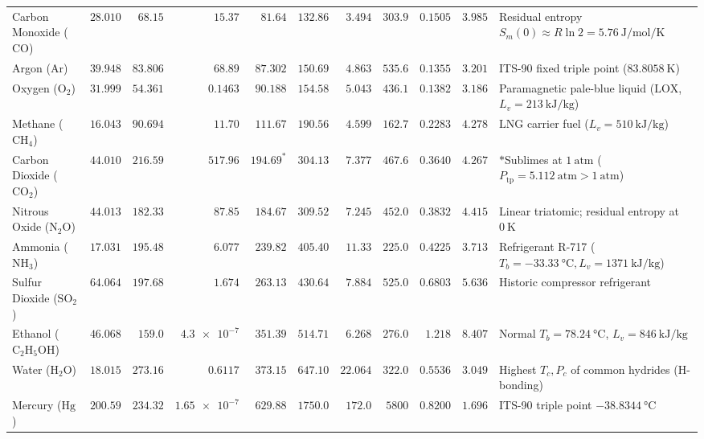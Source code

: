 \begin{center}
\begin{tabularx}{\linewidth}{@{}l r r r r r r r r r X@{}}
Carbon Monoxide ($\mathrm{CO}$) & $28.010$ & $68.15$ & $15.37$ & $81.64$ & $132.86$ & $3.494$ & $303.9$ & $0.1505$ & $3.985$ & Residual entropy $S_m(0) \approx R\ln 2 = \SI{5.76}{\joule\per\mole\per\kelvin}$ \\
Argon ($\mathrm{Ar}$) & $39.948$ & $83.806$ & $68.89$ & $87.302$ & $150.69$ & $4.863$ & $535.6$ & $0.1355$ & $3.201$ & ITS-90 fixed triple point ($\SI{83.8058}{\kelvin}$) \\
Oxygen ($\mathrm{O_2}$) & $31.999$ & $54.361$ & $0.1463$ & $90.188$ & $154.58$ & $5.043$ & $436.1$ & $0.1382$ & $3.186$ & Paramagnetic pale-blue liquid ($\mathrm{LOX}$, $L_v = \SI{213}{\kilo\joule\per\kilogram}$) \\
Methane ($\mathrm{CH_4}$) & $16.043$ & $90.694$ & $11.70$ & $111.67$ & $190.56$ & $4.599$ & $162.7$ & $0.2283$ & $4.278$ & $\mathrm{LNG}$ carrier fuel ($L_v = \SI{510}{\kilo\joule\per\kilogram}$) \\
Carbon Dioxide ($\mathrm{CO_2}$) & $44.010$ & $\mathbf{216.59}$ & $\mathbf{517.96}$ & $194.69^*$ & $304.13$ & $7.377$ & $467.6$ & $0.3640$ & $4.267$ & $*$Sublimes at $\SI{1}{\text{atm}}$ ($P_{\mathrm{tp}} = \SI{5.112}{\text{atm}} > \SI{1}{\text{atm}}$) \\
Nitrous Oxide ($\mathrm{N_2O}$) & $44.013$ & $182.33$ & $87.85$ & $184.67$ & $309.52$ & $7.245$ & $452.0$ & $0.3832$ & $4.415$ & Linear triatomic; residual entropy at $\SI{0}{\kelvin}$ \\
Ammonia ($\mathrm{NH_3}$) & $17.031$ & $195.48$ & $6.077$ & $239.82$ & $405.40$ & $11.33$ & $225.0$ & $0.4225$ & $3.713$ & Refrigerant R-717 ($T_b = -\SI{33.33}{\celsius}, L_v = \SI{1371}{\kilo\joule\per\kilogram}$) \\
Sulfur Dioxide ($\mathrm{SO_2}$) & $64.064$ & $197.68$ & $1.674$ & $263.13$ & $430.64$ & $7.884$ & $525.0$ & $0.6803$ & $5.636$ & Historic compressor refrigerant \\
Ethanol ($\mathrm{C_2H_5OH}$) & $46.068$ & $159.0$ & $\num{4.3e-7}$ & $351.39$ & $514.71$ & $6.268$ & $276.0$ & $1.218$ & $8.407$ & Normal $T_b = \SI{78.24}{\celsius}$, $L_v = \SI{846}{\kilo\joule\per\kilogram}$ \\
Water ($\mathrm{H_2O}$) & $18.015$ & $\mathbf{273.16}$ & $\mathbf{0.6117}$ & $373.15$ & $647.10$ & $22.064$ & $322.0$ & $0.5536$ & $3.049$ & Highest $T_c, P_c$ of common hydrides (H-bonding) \\
Mercury ($\mathrm{Hg}$) & $200.59$ & $234.32$ & $\num{1.65e-7}$ & $629.88$ & $1750.0$ & $172.0$ & $5800$ & $0.8200$ & $1.696$ & ITS-90 triple point $-\SI{38.8344}{\celsius}$ \\\bottomrule
\end{tabularx}
\end{center}


